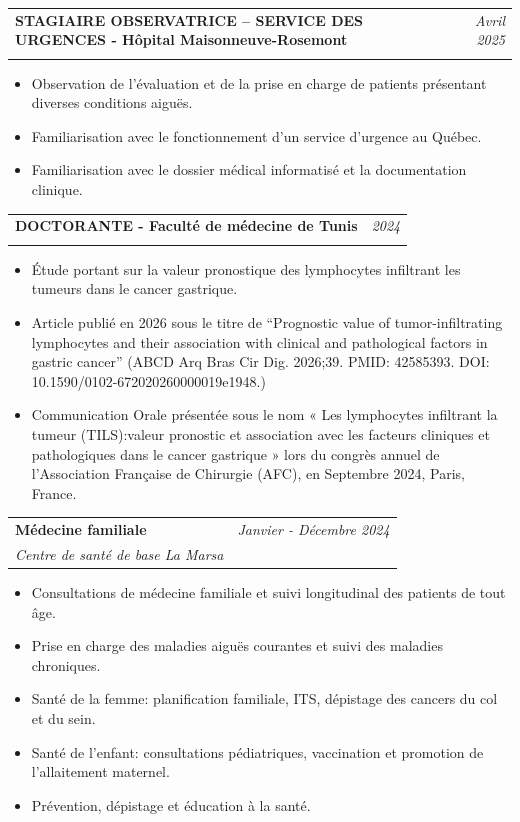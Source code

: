 \documentclass[a4paper,11pt]{article}
\makeatletter
\newcommand{\resumeSubheading}[4]{
\vspace{0.5mm}\item
    \begin{tabular*}{0.98\textwidth}[t]{l@{\extracolsep{\fill}}r}
        \textbf{#1} & \textit{\footnotesize{#4}} \\
        \textit{\footnotesize{#3}} &  \footnotesize{#2}\\
    \end{tabular*}
    \vspace{-2.4mm}
}
\newcommand{\resumeItemListStart}{\begin{itemize}[leftmargin=*,labelsep=1mm,itemsep=0.5mm]}
\newcommand{\resumeItemListEnd}{\end{itemize}\vspace{-2mm}}
\makeatother
\begin{document}
    \resumeSubheading
      {{STAGIAIRE OBSERVATRICE – SERVICE DES URGENCES - Hôpital Maisonneuve-Rosemont}}{}
      {}{Avril 2025}
      \resumeItemListStart
        \item Observation de l’évaluation et de la prise en charge de patients présentant diverses conditions \newline aiguës.
        \item Familiarisation avec le fonctionnement d’un service d’urgence au Québec.
        \item Familiarisation avec le dossier médical informatisé et la documentation clinique.
    \resumeItemListEnd

    \resumeSubheading
      {{DOCTORANTE - Faculté de médecine de Tunis}}{}
      {}{2024}
      \resumeItemListStart
        \item Étude portant sur la valeur pronostique des lymphocytes infiltrant les tumeurs dans le \newline cancer gastrique.
        \item Article publié en 2026 sous le titre de “Prognostic value of tumor-infiltrating lymphocytes \newline and their association with clinical and pathological factors in gastric cancer” (ABCD Arq \newline Bras Cir Dig. 2026;39. PMID: 42585393. DOI: 10.1590/0102-672020260000019e1948.)
        \item Communication Orale présentée sous le nom « Les lymphocytes infiltrant la tumeur (TILS):\newline valeur pronostic et association avec les facteurs cliniques et pathologiques dans le cancer \newline gastrique » lors du congrès annuel de l'Association Française de Chirurgie (AFC), en \newline Septembre 2024, Paris, France.
    \resumeItemListEnd
    \vspace{5mm}
    \vspace{1mm}
    \resumeSubheading
      {{Médecine familiale}}{}
      {Centre de santé de base La Marsa}{Janvier - Décembre 2024}
      \resumeItemListStart
        \item Consultations de médecine familiale et suivi longitudinal des patients de tout âge.
        \item Prise en charge des maladies aiguës courantes et suivi des maladies chroniques.
        \item Santé de la femme: planification familiale, ITS, dépistage des cancers du col et du sein.
        \item Santé de l’enfant: consultations pédiatriques, vaccination et promotion de l’allaitement \newline maternel.
        \item Prévention, dépistage et éducation à la santé.
    \resumeItemListEnd
\end{document}
